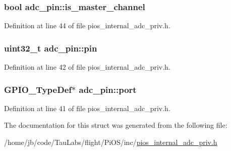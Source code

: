 \hypertarget{structadc__pin_a6c9e5136cd84787a0047a66976b5a170}{
\subsubsection[{is\-\_\-master\-\_\-channel}]{\setlength{\rightskip}{0pt plus 5cm}bool {\bf adc\-\_\-pin\-::is\-\_\-master\-\_\-channel}}}\label{structadc__pin_a6c9e5136cd84787a0047a66976b5a170}


\-Definition at line 44 of file pios\-\_\-internal\-\_\-adc\-\_\-priv.\-h.

\hypertarget{structadc__pin_a20be5a8bbbb9954f4d52fb44da32c9e3}{
\subsubsection[{pin}]{\setlength{\rightskip}{0pt plus 5cm}uint32\-\_\-t {\bf adc\-\_\-pin\-::pin}}}\label{structadc__pin_a20be5a8bbbb9954f4d52fb44da32c9e3}


\-Definition at line 42 of file pios\-\_\-internal\-\_\-adc\-\_\-priv.\-h.

\hypertarget{structadc__pin_ac1b069f460728fe2ae908639a9e06351}{
\subsubsection[{port}]{\setlength{\rightskip}{0pt plus 5cm}\-G\-P\-I\-O\-\_\-\-Type\-Def$\ast$ {\bf adc\-\_\-pin\-::port}}}\label{structadc__pin_ac1b069f460728fe2ae908639a9e06351}


\-Definition at line 41 of file pios\-\_\-internal\-\_\-adc\-\_\-priv.\-h.



\-The documentation for this struct was generated from the following file\-:\begin{DoxyCompactItemize}
\item 
/home/jb/code/\-Tau\-Labs/flight/\-Pi\-O\-S/inc/\hyperlink{pios__internal__adc__priv_8h}{pios\-\_\-internal\-\_\-adc\-\_\-priv.\-h}\end{DoxyCompactItemize}
